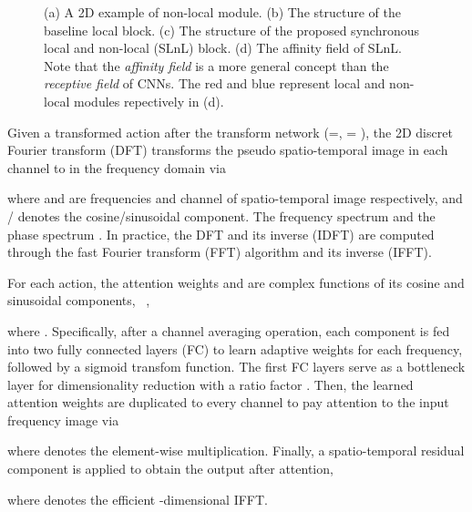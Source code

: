 \documentclass{article}
\begin{document}
\begin{figure*}[htb]
	\centering
	\caption{(a) A 2D  example of non-local module. (b) The structure of the baseline local block. (c) The structure of the proposed synchronous local and non-local (SLnL) block. (d) The affinity field of SLnL. Note that the \textit{affinity field} is a more general concept than the \textit{receptive field} of CNNs. The red and blue represent local and non-local modules repectively in (d).}
	\label{Fig3}
\end{figure*}

Given a transformed action after the transform network {\myfont} ({\myfont =}, = ), the 2D discret Fourier transform (DFT) transforms the pseudo spatio-temporal image {\myfont} in each channel to
{\myfont} in the
frequency domain via
{\myfont
	
}where  and  are frequencies and channel of spatio-temporal image respectively, and {\myfont}/{\myfont} denotes the cosine/sinusoidal component. The frequency spectrum {\myfont} and the phase spectrum {\myfont}. In practice, the DFT and its inverse (IDFT) are computed through the fast Fourier transform (FFT) algorithm and its inverse (IFFT). 

For each action, the attention weights {\myfont} and {\myfont} are complex functions of its cosine and sinusoidal components, \ie~, {\myfont
	
}where {\myfont}. Specifically, after a channel averaging operation, each component is fed into two fully connected layers (FC) to learn adaptive weights for each frequency, followed by a sigmoid transfom function. The first FC layers serve as a bottleneck layer \cite{DBLP:conf/cvpr/HeZRS16}  for dimensionality reduction with a ratio factor . Then, the learned attention weights are duplicated to every channel to pay attention to the input frequency image via
{\myfont
	
}where  denotes the element-wise multiplication. Finally, a spatio-temporal residual component is applied to obtain the output {\myfont} after attention, \ie~
{\myfont
	
}where {\myfont} denotes the efficient -dimensional IFFT.
\end{document}
